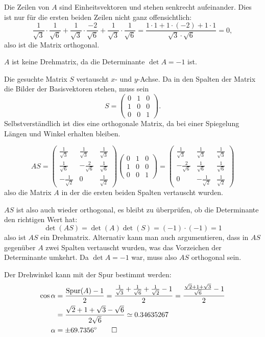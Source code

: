 \begin{loesung}
\begin{teilaufgaben}
\item Die Zeilen von $A$ sind Einheitsvektoren und stehen
senkrecht aufeinander. Dies ist nur für die ersten beiden
Zeilen nicht ganz offensichtlich:
\[
\frac1{\sqrt{3}}\cdot\frac1{\sqrt{6}}
+
\frac1{\sqrt{3}}\cdot\frac{-2}{\sqrt{6}}
+
\frac1{\sqrt{3}}\cdot\frac1{\sqrt{6}}
=\frac{1\cdot 1+1\cdot(-2)+1\cdot 1}{\sqrt{3}\cdot\sqrt{6}}=0,
\]
also ist die Matrix orthogonal.
\item $A$ ist keine Drehmatrix, da die Determinante
$\det A=-1$ ist.
\item Die gesuchte Matrix $S$ vertauscht $x$- und $y$-Achse. Da in den
Spalten der Matrix die Bilder der Basisvektoren stehen, muss sein
\[
S=\begin{pmatrix}0&1&0\\1&0&0\\0&0&1\end{pmatrix}.
\]
Selbstverständlich ist dies eine orthogonale Matrix, da bei einer
Spiegelung Längen und Winkel erhalten bleiben.
\item
\[
AS=
\begin{pmatrix}
\frac1{\sqrt{3}}&\frac1{\sqrt{3}}&\frac1{\sqrt{3}}\\
\frac1{\sqrt{6}}&-\frac2{\sqrt{6}}&\frac1{\sqrt{6}}\\
-\frac1{\sqrt{2}}&0&\frac1{\sqrt{2}}
\end{pmatrix}
\begin{pmatrix}0&1&0\\1&0&0\\0&0&1\end{pmatrix}
=\begin{pmatrix}
\frac1{\sqrt{3}}&\frac1{\sqrt{3}}&\frac1{\sqrt{3}}\\
-\frac2{\sqrt{6}}&\frac1{\sqrt{6}}&\frac1{\sqrt{6}}\\
0&-\frac1{\sqrt{2}}&\frac1{\sqrt{2}}
\end{pmatrix}
\]
also die Matrix $A$ in der die ersten beiden Spalten vertauscht
wurden.
\item
$AS$ ist also auch wieder orthogonal, es bleibt zu überprüfen,
ob die Determinante den richtigen Wert hat:
\[
\det(AS)=\det(A)\det(S)=(-1)\cdot(-1)=1
\]
also ist $AS$ ein Drehmatrix. Alternativ kann man auch argumentieren,
dass in $AS$ gegenüber $A$ zwei Spalten vertauscht wurden, was das
Vorzeichen der Determinante umkehrt. Da $\det A=-1$ war, muss also
$AS$ orthogonal sein.
\item
Der Drehwinkel kann mit der Spur bestimmt
werden:
\begin{align*}
\cos \alpha&=\frac{\operatorname{Spur}(A)-1}2=\frac{\frac1{\sqrt{3}}+\frac1{\sqrt{6}}+\frac1{\sqrt{2}}-1}2
=\frac{\frac{\sqrt{2}+1+\sqrt{3}}{\sqrt{6}}-1}2
\\
&=\frac{\sqrt{2}+1+\sqrt{3}-\sqrt{6}}{2\sqrt{6}}\simeq  0.34635267
\\
\alpha&=\pm 69.7356^\circ
\qedhere
\end{align*}
\end{teilaufgaben}
\end{loesung}

